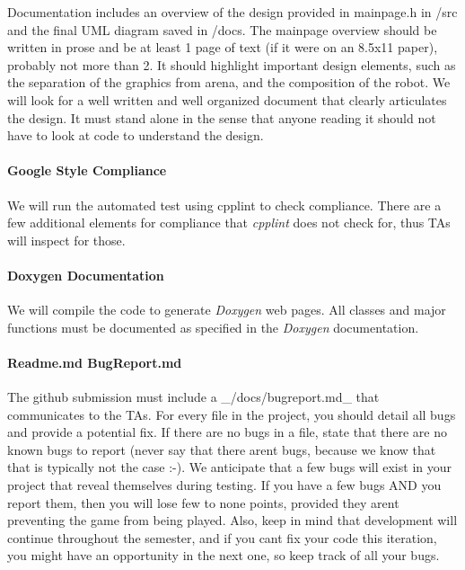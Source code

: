 Documentation includes an overview of the design provided in mainpage.\+h in /src and the final U\+ML diagram saved in /docs. The mainpage overview should be written in prose and be at least 1 page of text (if it were on an 8.\+5x11 paper), probably not more than 2. It should highlight important design elements, such as the separation of the graphics from arena, and the composition of the robot. We will look for a well written and well organized document that clearly articulates the design. It must stand alone in the sense that anyone reading it should not have to look at code to understand the design.

\paragraph*{Google Style Compliance}

We will run the automated test using \textquotesingle{}cpplint\textquotesingle{} to check compliance. There are a few additional elements for compliance that {\itshape cpplint} does not check for, thus T\+As will inspect for those.

\paragraph*{Doxygen Documentation}

We will compile the code to generate {\itshape Doxygen} web pages. All classes and major functions must be documented as specified in the {\itshape Doxygen} documentation.

\paragraph*{Readme.\+md Bug\+Report.\+md}

The github submission must include a \+\_\+/docs/bugreport.\+md\+\_\+ that communicates to the T\+As. For every file in the project, you should detail all bugs and provide a potential fix. If there are no bugs in a file, state that there are no known bugs to report (never say that there aren\textquotesingle{}t bugs, because we know that that is typically not the case \+:-\/). We anticipate that a few bugs will exist in your project that reveal themselves during testing. If you have a few bugs A\+ND you report them, then you will lose few to none points, provided they aren\textquotesingle{}t preventing the game from being played. Also, keep in mind that development will continue throughout the semester, and if you can\textquotesingle{}t fix your code this iteration, you might have an opportunity in the next one, so keep track of all your bugs.

